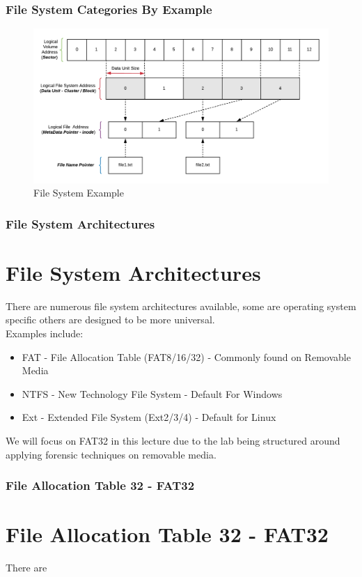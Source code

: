 \documentclass{beamer}
\begin{document}
\begin{frame}
	\frametitle{File System Categories By Example}
	\begin{figure}[h]
		\includegraphics[scale=0.65]{file-system-example}
		\caption{File System Example}
		\label{fig:fs-example}
	\end{figure}
\end{frame}

\begin{frame}
	\frametitle{File System Architectures}
	\section*{File System Architectures}
	There are numerous file system architectures available, some are operating system specific others are designed to be more universal. \\
	
	Examples include:
	\begin{itemize}
		\item FAT - File Allocation Table (FAT8/16/32) - Commonly found on Removable Media 
		\item NTFS - New Technology File System - Default For Windows
		\item Ext - Extended File System (Ext2/3/4) - Default for Linux
	\end{itemize}
	
	
	We will focus on FAT32 in this lecture due to the lab being structured around applying forensic techniques on removable media.
\end{frame}

\begin{frame}
	\frametitle{File Allocation Table 32 - FAT32}
	\section*{File Allocation Table 32 - FAT32}
	There are 
\end{frame}
\end{document}
